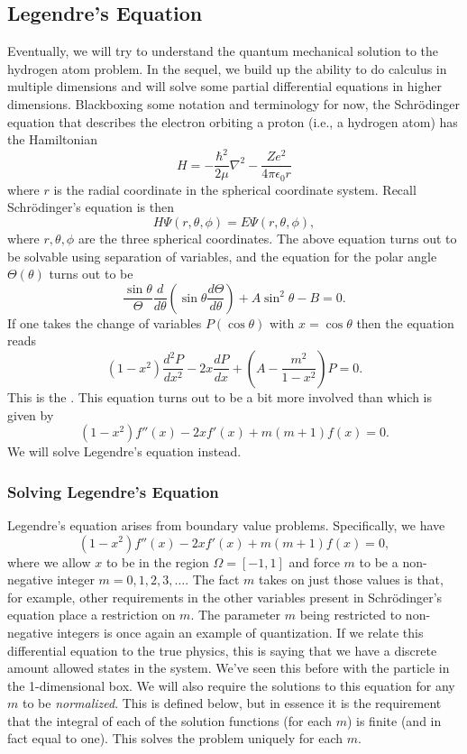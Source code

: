 \subsection{Legendre's Equation}

Eventually, we will try to understand the quantum mechanical solution to the hydrogen atom problem.  In the sequel, we build up the ability to do calculus in multiple dimensions and will solve some partial differential equations in higher dimensions.  Blackboxing some notation and terminology for now, the Schr\"odinger equation that describes the electron orbiting a proton (i.e., a hydrogen atom) has the Hamiltonian
\[
H=-\frac{\hbar^2}{2\mu} \nabla^2 - \frac{Ze^2}{4\pi \epsilon_0 r}
\]
where $r$ is the radial coordinate in the spherical coordinate system.  Recall Schr\"odinger's equation is then
\[
H\Psi(r,\theta, \phi) = E\Psi(r, \theta, \phi),
\]
where $r,\theta,\phi$ are the three spherical coordinates. The above equation turns out to be solvable using separation of variables, and the equation for the polar angle $\Theta(\theta)$ turns out to be
\[
\frac{\sin \theta}{\Theta} \frac{d}{d\theta}\left( \sin \theta \frac{d\Theta}{d\theta}\right) +A \sin^2 \theta - B = 0.
\]
If one takes the change of variables $P(\cos \theta)$ with $x=\cos \theta$ then the equation reads
\[
(1-x^2)\frac{d^2P}{dx^2}-2x\frac{dP}{dx}+\left(A-\frac{m^2}{1-x^2}\right)P=0.
\]
This is the .  This equation turns out to be a bit more involved than  which is given by
\[
(1-x^2)f''(x)-2xf'(x)+m(m+1)f(x)=0.
\]
We will solve Legendre's equation instead.  

\subsubsection{Solving Legendre's Equation}

Legendre's equation arises from boundary value problems. Specifically, we have
\[
(1-x^2)f''(x)-2xf'(x)+m(m+1)f(x)=0,
\]
where we allow $x$ to be in the region $\Omega = [-1,1]$ and force $m$ to be a non-negative integer $m=0,1,2,3,\dots$.  The fact $m$ takes on just those values is that, for example, other requirements in the other variables present in Schr\"odinger's equation place a restriction on $m$. The parameter $m$ being restricted to non-negative integers is once again an example of quantization.  If we relate this differential equation to the true physics, this is saying that we have a discrete amount allowed states in the system.  We've seen this before with the particle in the 1-dimensional box.  We will also require the solutions to this equation for any $m$ to be \emph{normalized}. This is defined below, but in essence it is the requirement that the integral of each of the solution functions (for each $m$) is finite (and in fact equal to one).  This solves the problem uniquely for each $m$.

